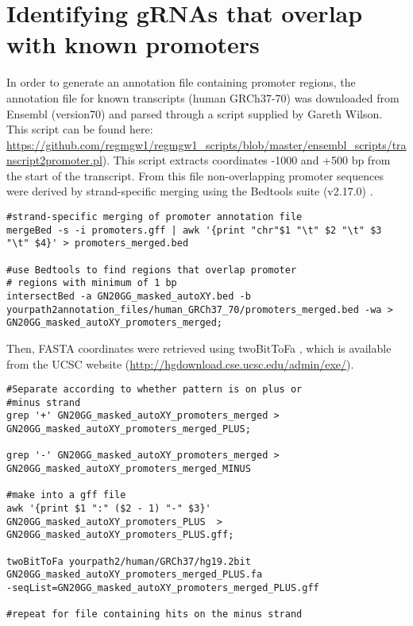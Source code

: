 \section{Identifying gRNAs that overlap with known promoters}

In order to generate an annotation file containing promoter regions,  the annotation file for known transcripts (human GRCh37-70) was downloaded from Ensembl (version70) and parsed through a script supplied by Gareth Wilson. This script can be found here: \url{https://github.com/regmgw1/regmgw1_scripts/blob/master/ensembl_scripts/transcript2promoter.pl}). This script extracts coordinates -1000 and +500 bp from the start of the transcript. From this file non-overlapping promoter sequences were derived by strand-specific merging using the Bedtools suite (v2.17.0) \cite{Quinlan:2010km}.

\begin{small}\begin{lstlisting}
#strand-specific merging of promoter annotation file
mergeBed -s -i promoters.gff | awk '{print "chr"$1 "\t" $2 "\t" $3 "\t" $4}' > promoters_merged.bed 

#use Bedtools to find regions that overlap promoter 
# regions with minimum of 1 bp 
intersectBed -a GN20GG_masked_autoXY.bed -b yourpath2annotation_files/human_GRCh37_70/promoters_merged.bed -wa > GN20GG_masked_autoXY_promoters_merged;
\end{lstlisting}\end{small}

Then, FASTA coordinates were retrieved using twoBitToFa \cite{Kent:2002bw}, which is available from the UCSC website (\url{http://hgdownload.cse.ucsc.edu/admin/exe/}).

\begin{small}\begin{lstlisting}
#Separate according to whether pattern is on plus or 
#minus strand
grep '+' GN20GG_masked_autoXY_promoters_merged >
GN20GG_masked_autoXY_promoters_merged_PLUS; 

grep '-' GN20GG_masked_autoXY_promoters_merged >
GN20GG_masked_autoXY_promoters_merged_MINUS 

#make into a gff file
awk '{print $1 ":" ($2 - 1) "-" $3}' GN20GG_masked_autoXY_promoters_PLUS  >
GN20GG_masked_autoXY_promoters_PLUS.gff;

twoBitToFa yourpath2/human/GRCh37/hg19.2bit
GN20GG_masked_autoXY_promoters_merged_PLUS.fa 
-seqList=GN20GG_masked_autoXY_promoters_merged_PLUS.gff 

#repeat for file containing hits on the minus strand
\end{lstlisting}\end{small}

